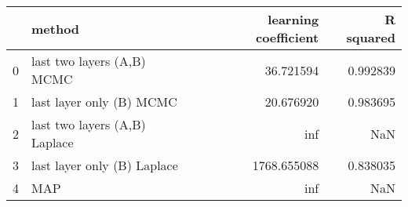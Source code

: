 \begin{tabular}{llrr}
\toprule
{} &                         method &  learning coefficient &  R squared \\
\midrule
0 &     last two layers (A,B) MCMC &             36.721594 &   0.992839 \\
1 &       last layer only (B) MCMC &             20.676920 &   0.983695 \\
2 &  last two layers (A,B) Laplace &                   inf &        NaN \\
3 &    last layer only (B) Laplace &           1768.655088 &   0.838035 \\
4 &                            MAP &                   inf &        NaN \\
\bottomrule
\end{tabular}
